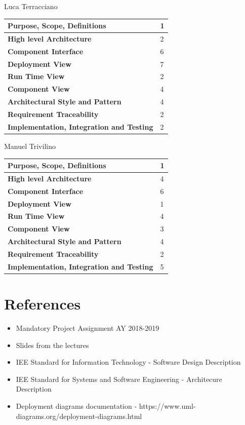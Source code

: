 \documentclass[a4paper]{article}
\begin{document}
Luca Terracciano

\begin{center}
\begin{tabular}{|l | l |}
    \hline \bf{Purpose, Scope, Definitions} & 1 \\ \hline
    \bf{High level Architecture}  & 2 \\ \hline
    \bf{Component Interface} & 6 \\ \hline
    \bf{Deployment View} & 7 \\ \hline
    \bf{Run Time View} & 2\\ \hline
    \bf{Component View} & 4 \\ \hline
    \bf{Architectural Style and Pattern} & 4 \\ \hline
    \bf{Requirement Traceability} & 2 \\ \hline
    \bf{Implementation, Integration and Testing} & 2 \\ \hline
\end{tabular}
\end{center}

Manuel Trivilino

\begin{center}
\begin{tabular}{|l | l |}
    \hline \bf{Purpose, Scope, Definitions} & 1 \\ \hline
    \bf{High level Architecture}  & 4 \\ \hline
    \bf{Component Interface} & 6 \\ \hline
    \bf{Deployment View} & 1 \\ \hline
    \bf{Run Time View} & 4\\ \hline
    \bf{Component View} & 3 \\ \hline
    \bf{Architectural Style and Pattern} & 4 \\ \hline
    \bf{Requirement Traceability} & 2 \\ \hline
    \bf{Implementation, Integration and Testing} & 5 \\ \hline
\end{tabular}
\end{center}

\section{References}

\begin{itemize}
    \item Mandatory Project Assignment AY 2018-2019
    \item Slides from the lectures
    \item IEE Standard for Information Technology - Software Design Description
    \item IEE Standard for Systems and Software Engineering - Architecure Description
    \item Deployment diagrams documentation - https://www.uml-diagrams.org/deployment-diagrams.html
\end{itemize}
\end{document}
